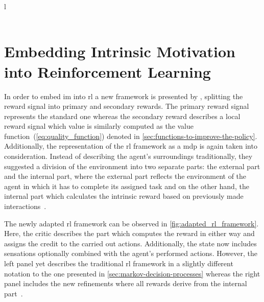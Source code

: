 \documentclass[draft,final]{vutinfth} %
\newcommand{\pautoref}[1]{(\autoref{#1})}
\newcommand{\p}[1]{see p. #1}
\begin{document}
\begin{table}[h]
\begin{tabular}{l}
                                                                                                                          \\ \hline
                                                     \\ \hline
        \end{tabular}
        \caption[Classification of Intrinsic Motivations in Reinforcement Learning]{Classification of \glspl{im} in \gls{rl}\protect\footnotemark[2]}
        \label{tab:clasification_im_rl}
    \end{table}
    \footnotetext[2]{\citep[\p{9}]{aubret_survey_2019}}

    \section{Embedding Intrinsic Motivation into Reinforcement Learning}\label{sec:embeddingglsinto-theglsframework}

    In order to embed \gls{im} into \gls{rl} a new framework is presented by \citeauthor{singh_intrinsically_2010}, splitting the reward signal into primary and secondary rewards.
    The primary reward signal represents the standard one whereas the secondary reward describes a local reward signal which value is similarly computed as the value function~\pautoref{eq:quality_function} denoted in \autoref{sec:functions-to-improve-the-policy}.
    Additionally, the representation of the \gls{rl} framework as a \gls{mdp} is again taken into consideration.
    Instead of describing the agent's surroundings traditionally, they suggested a division of the environment into two separate parts: the external part and the internal part, where the external part reflects the environment of the agent in which it has to complete its assigned task and on the other hand, the internal part which calculates the intrinsic reward based on previously made interactions~\citep{aubret_survey_2019}.

    The newly adapted \gls{rl} framework can be observed in \autoref{fig:adapted_rl_framework}.
    Here, the critic describes the part which computes the reward in either way and assigns the credit to the carried out actions.
    Additionally, the state now includes sensations optionally combined with the agent's performed actions.
    However, the left panel yet describes the traditional \gls{rl} framework in a slightly different notation to the one presented in \autoref{sec:markov-decision-processes} whereas the right panel includes the new refinements where all rewards derive from the internal part~\citep{singh_intrinsically_2010}.
\end{document}
